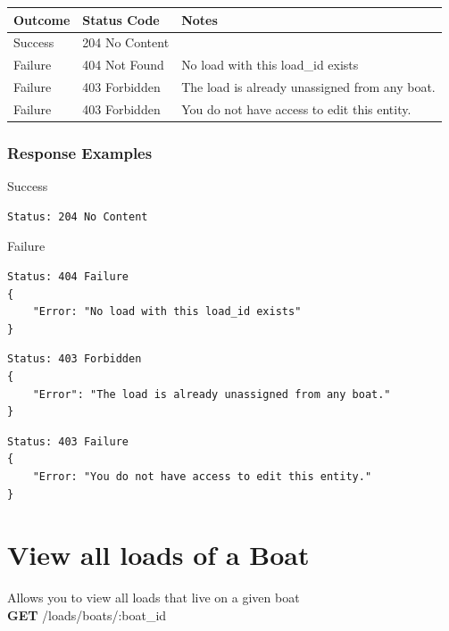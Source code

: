 \documentclass[letterpaper,11pt,titlepage,draftclsnofoot,onecolumn,compsoc,utf8,latin1]{IEEEtran}
\begin{document}
\begin{singlespace}
\begin{center}
\begin{tabular}{ |p{}|p{}|p{}| } 
 \hline
 \textbf{Outcome} & \textbf{Status Code} & \textbf{Notes}  \\  \hline
 Success & 204 No Content &  \\ \hline
 Failure & 404 Not Found & No load with this load\_id exists \\ \hline 
 Failure & 403 Forbidden & The load is already unassigned from any boat.\\ \hline
 Failure & 403 Forbidden & You do not have access to edit this entity. \\
 \hline
\end{tabular}
\end{center}

\subsubsection{Response Examples}

\noindent \Large{Success}

\begin{lstlisting}[]
Status: 204 No Content
\end{lstlisting}

\noindent \Large{Failure}

\begin{lstlisting}[]
Status: 404 Failure
{
    "Error: "No load with this load_id exists"
}
\end{lstlisting}

\begin{lstlisting}[]
Status: 403 Forbidden
{
    "Error": "The load is already unassigned from any boat."
}
\end{lstlisting}

\begin{lstlisting}[]
Status: 403 Failure
{
    "Error: "You do not have access to edit this entity."
}
\end{lstlisting}


\newpage

\section{View all loads of a Boat}

Allows you to view all loads that live on a given boat\\

\noindent \textbf{GET} /loads/boats/:boat\_id


\end{singlespace}
\end{document}
